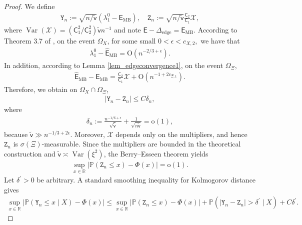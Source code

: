 \documentclass[12pt]{article}
\theoremstyle{plain}
\numberwithin{equation}{section}
\begin{document}
\begin{proof}
	We define
	\begin{align*}
		\mathtt{Y}_n:=\sqrt{n/\tilde{\mathsf{v}}}(\lambda^0_1-\mathsf{E}_{\mathrm{MB}}),\quad \mathtt{Z}_n:=\sqrt{n/\tilde{\mathsf{v}}} \frac{\mathsf{C}_2}{\mathsf{C}_1} \mathcal{X},
	\end{align*}
	where $\operatorname{Var}(\mathcal{X})=(\mathsf{C}_1^2/\mathsf{C}_2^2)\tilde{\mathsf{v}}n^{-1}$ and note $\mathsf{E}-\Delta_{\mathrm{edge}}=\mathsf{E}_{\mathrm{MB}}$. According to Theorem 3.7 of \cite{ding2021spiked}, on the event $\Omega_X$, for some small $0<\epsilon<c_{X,2},$ we have that 
	\begin{align*}
		\lambda_1^0-\widehat{\mathsf{E}}_{\mathrm{MB}}=\mathrm{O}(n^{-2/3+\epsilon}).
	\end{align*}
	In addition, according to Lemma \ref{lem_edgeconvergence1}, on the event $\Omega_{\Xi}$, 
	\begin{align*}
		\widehat{\mathsf{E}}_{\mathrm{MB}}-\mathsf{E}_{\mathrm{MB}}=\frac{\mathsf{C}_2}{\mathsf{C}_1}\mathcal{X}+\mathrm{O}(n^{-1+2c_{\Xi,1}}).
	\end{align*}
	Therefore, we obtain on $\Omega_X\cap\Omega_{\Xi}$,
	\begin{align*}
		|\mathtt{Y}_n-\mathtt{Z}_n|
		\le
		C\delta_n,
	\end{align*}
	where
	\begin{align*}
		\delta_n:=\frac{n^{-1/6+\epsilon}}{\sqrt{\tilde{\mathsf{v}}}}+\frac{1}{\sqrt{n\tilde{\mathsf{v}}}}=\mathrm{o}(1),
	\end{align*}
	because $\tilde{\mathsf v}\gg n^{-1/3+2\epsilon}$.
	Moreover, $\mathcal{X}$ depends only on the multipliers, and hence $\mathtt{Z}_n$ is $\sigma(\Xi)$-measurable. Since the multipliers are bounded in the theoretical construction and $\tilde{\mathsf v}\asymp \operatorname{Var}(\xi^2)$, the Berry--Esseen theorem yields
	\begin{align}\label{eq_asymGaussian_Z}
		\sup_{x\in\mathbb R}|\mathbb{P}(\mathtt{Z}_n\leq x)-\Phi(x)|=\mathrm{o}(1).
	\end{align}
	Let $\delta^{\prime}>0$ be arbitrary. A standard smoothing inequality for Kolmogorov distance gives
	\begin{align*}
		\sup_{x\in\mathbb R}\left|\mathbb P(\mathtt Y_n\le x\mid X)-\Phi(x)\right|
		\le
		\sup_{x\in\mathbb R}\left|\mathbb P(\mathtt Z_n\le x)-\Phi(x)\right|
		+
		\mathbb P(|\mathtt Y_n-\mathtt Z_n|>\delta^{\prime}\mid X)
		+C\delta^{\prime} .
	\end{align*}

\end{proof}
\end{document}

